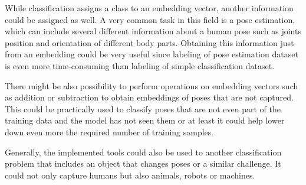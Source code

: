 While classification assigns a class to an embedding vector, another information could be assigned as well. A very common task in this field is a pose estimation, which can include several different information about a human pose such as joints position and orientation of different body parts. Obtaining this information just from an embedding could be very useful since labeling of pose estimation dataset is even more time-consuming than labeling of simple classification dataset.

There might be also possibility to perform operations on embedding vectors such as addition or subtraction to obtain embeddings of poses that are not captured. This could be practically used to classify poses that are not even part of the training data and the model has not seen them or at least it could help lower down even more the required number of training samples.

Generally, the implemented tools could also be used to another classification problem that includes an object that changes poses or a similar challenge. It could not only capture humans but also animals, robots or machines.
